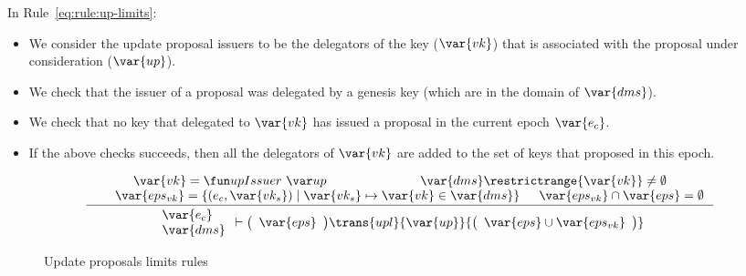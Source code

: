 In Rule~\ref{eq:rule:up-limits}:
\begin{itemize}
\item We consider the update proposal issuers to be the delegators of the key
  ($\var{vk}$) that is associated with the proposal under consideration
  ($\var{up}$).

\item We check that the issuer of a proposal was delegated by a genesis key
  (which are in the domain of $\var{dms}$).
\item We check that no key that delegated to $\var{vk}$ has issued a proposal
  in the current epoch $\var{e_c}$.
\item If the above checks succeeds, then all the delegators of $\var{vk}$ are
  added to the set of keys that proposed in this epoch.
\end{itemize}

\begin{figure}[htb]
  \begin{equation}
    \label{eq:rule:up-limits}
    \inference
    {\var{vk} = \upIssuer{up}
      &  \var{dms} \restrictrange \{\var{vk}\} \neq \emptyset\\
      & \var{eps_{vk}} = \{ (e_c, \var{vk_s})
      \mid \var{vk_s} \mapsto \var{vk} \in \var{dms}\}
      & \var{eps_{vk}} \cap \var{eps} = \emptyset
    }
    {
      {\begin{array}{l}
         \var{e_c}\\
         \var{dms}
       \end{array}
      }
      \vdash
      {
        \left(
          \begin{array}{l}
            \var{eps}
          \end{array}
        \right)
      }
      \trans{upl}{\var{up}}
      {
        \left(
          \begin{array}{l}
            \var{eps} \cup \var{eps_{vk}}
          \end{array}
        \right)
      }
    }
  \end{equation}
  \caption{Update proposals limits rules}
  \label{fig:rules:up-limits}
\end{figure}


